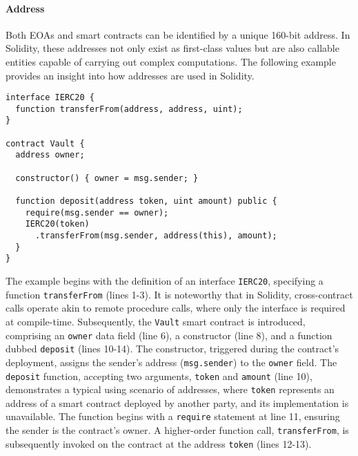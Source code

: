 \paragraph{Address}
Both EOAs and smart contracts can be identified by a unique 160-bit address. 
In Solidity, these addresses not only exist as first-class values but are also callable entities capable of carrying out complex computations. 
The following example provides an insight into how addresses are used in Solidity. 
\begin{lstlisting}[numbers=right]
interface IERC20 {
  function transferFrom(address, address, uint);
}

contract Vault {
  address owner;
  
  constructor() { owner = msg.sender; }

  function deposit(address token, uint amount) public {
    require(msg.sender == owner);
    IERC20(token)
      .transferFrom(msg.sender, address(this), amount);
  }
}
\end{lstlisting}
The example begins with the definition of an interface \texttt{IERC20}, specifying a function \texttt{transferFrom} (lines 1-3). 
It is noteworthy that in Solidity, cross-contract calls operate akin to remote procedure calls, where only the interface is required at compile-time.
Subsequently, the \texttt{Vault} smart contract is introduced, comprising an \texttt{owner} data field (line 6), a constructor (line 8), and a function dubbed \texttt{deposit} (lines 10-14). 
The constructor, triggered during the contract's deployment, assigns the sender's address (\texttt{msg.sender}) to the \texttt{owner} field.
The \texttt{deposit} function, accepting two arguments, \texttt{token} and \texttt{amount} (line 10), demonstrates a typical using scenario of addresses, where \texttt{token} represents an address of a smart contract deployed by another party, and its implementation is unavailable. 
The function begins with a \texttt{require} statement at line 11, ensuring the sender is the contract's owner. 
A higher-order function call, \texttt{transferFrom}, is subsequently invoked on the contract at the address \texttt{token} (lines 12-13).

